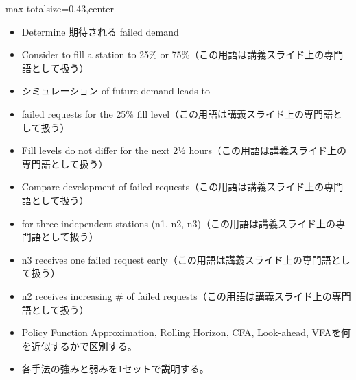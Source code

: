 \clearpage
{}
\begin{minipage}[t]{0.405\textwidth}
\begin{adjustbox}{max totalsize={\textwidth}{0.43\textheight},center}
\begin{minipage}{\textwidth}\scriptsize
{}\begin{itemize}
\item Determine 期待される failed demand
\item Consider to fill a station to 25\% or 75\%（この用語は講義スライド上の専門語として扱う）
\item シミュレーション of future demand leads to
\item failed requests for the 25\% fill level（この用語は講義スライド上の専門語として扱う）
\item Fill levels do not differ for the next 2½ hours（この用語は講義スライド上の専門語として扱う）
\item Compare development of failed requests（この用語は講義スライド上の専門語として扱う）
\item for three independent stations (n1, n2, n3)（この用語は講義スライド上の専門語として扱う）
\item n3 receives one failed request early（この用語は講義スライド上の専門語として扱う）
\item n2 receives increasing \# of failed requests（この用語は講義スライド上の専門語として扱う）
\end{itemize}\begin{itemize}
\item Policy Function Approximation, Rolling Horizon, CFA, Look-ahead, VFAを何を近似するかで区別する。
\item 各手法の強みと弱みを1セットで説明する。
\end{itemize}
\end{minipage}
\end{adjustbox}
\end{minipage}\hfill

